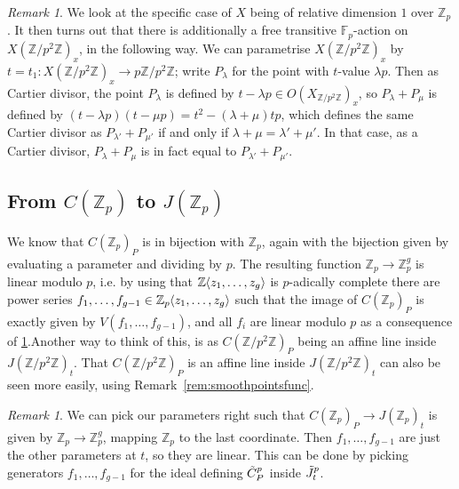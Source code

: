 \documentclass[12pt]{article}
\newcommand{\Z}{\mathbb{Z}}
\newcommand{\F}{\mathbb{F}}
\renewcommand{\angle}[1]{\hspace{-2pt}\left\langle #1 \right\rangle}
\theoremstyle{plain}
\theoremstyle{definition}
\theoremstyle{remark}
\newtheorem{rem}[thm]{Remark} %
\begin{document}
\begin{rem}
\label{rem:cartierlinear}
We look at the specific case of $X$ being of relative dimension $1$ over $\Z_p$. It then turns out that there is additionally a free transitive $\F_p$-action on $X(\Z/p^2\Z)_x$, in the following way. We can parametrise $X(\Z/p^2\Z)_x$ by $t = t_1 : X(\Z/p^2\Z)_x \to p\Z/p^2\Z$; write $P_{\lambda}$ for the point with $t$-value $\lambda p$. Then as Cartier divisor, the point $P_{\lambda}$ is defined by $t - \lambda p \in O(X_{\Z/p^2\Z})_x$, so $P_{\lambda} + P_{\mu}$ is defined by $(t-\lambda p)(t-\mu p) = t^2 - (\lambda + \mu)tp$, which defines the same Cartier divisor as $P_{\lambda'} + P_{\mu'}$ if and only if $\lambda + \mu = \lambda' + \mu'$. In that case, as a Cartier divisor, $P_{\lambda} + P_{\mu}$ is in fact equal to $P_{\lambda'} + P_{\mu'}$.
\end{rem}

\subsection{From \texorpdfstring{$C(\Z_p)$}{C(Z\_p)} to \texorpdfstring{$J(\Z_p)$}{J(Z\_p)}}
\label{subsection:czptojzp}
We know that $C(\Z_p)_P$ is in bijection with $\Z_p$, again with the bijection given by evaluating a parameter and dividing by $p$. The resulting function $\Z_p \to \Z_p^g$ is linear modulo $p$, i.e. by using that $\Z\angle{z_1,\dots,z_g}$ is $p$-adically complete there are power series $f_1,\dots,f_{g-1} \in \Z_p\angle{z_1,\dots,z_g}$ such that the image of $C(\Z_p)_P$ is exactly given by $V(f_1,\dots,f_{g-1})$, and all $f_i$ are linear modulo $p$ as a consequence of \ref{rem:cartierlinear}.Another way to think of this, is as $C(\Z/p^2\Z)_P$ being an affine line inside $J(\Z/p^2\Z)_t$. That $C(\Z/p^2\Z)_P$ is an affine line inside $J(\Z/p^2\Z)_t$ can also be seen more easily, using Remark~\ref{rem:smoothpointsfunc}. 

\begin{rem}
\label{rem:fislinear}
We can pick our parameters right such that $C(\Z_p)_P \to J(\Z_p)_t$ is given by $\Z_p \to \Z_p^g$, mapping $\Z_p$ to the last coordinate. Then $f_1,\dots,f_{g-1}$ are just the other parameters at $t$, so they are linear. This can be done by picking generators $f_1,\dots,f_{g-1}$ for the ideal defining $\Tilde{C}_P^p$ inside $\Tilde{J}_t^p$.
\end{rem}
\end{document}
